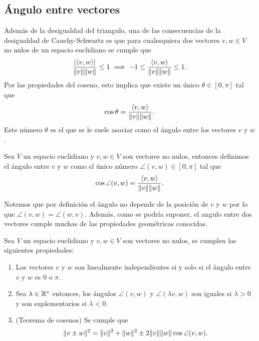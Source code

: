 \subsection{Ángulo entre vectores}

Además de la desigualdad del triangulo, una de las consecuencias de la desigualdad de Cauchy-Schwartz es que para cualesquiera dos vectores $v,w \in V$ no nulos de un espacio euclidiano se cumple que
\[
  \frac{\mathopen|\langle v,w\rangle\mathclose|}{\mathopen\|v\mathclose\|\mathopen\|w\mathclose\|} \leq 1 \implies  -1 \leq \frac{\langle v,w\rangle}{\mathopen\|v\mathclose\|\mathopen\|w\mathclose\|} \leq 1.
\]
Por las propiedades del coseno, esto implica que existe un único $\theta \in [0,\pi]$ tal que 
\[
  \cos\theta = \frac{\langle v,w\rangle}{\mathopen\|v\mathclose\|\mathopen\|w\mathclose\|}.
\]
Este número $\theta$ es el que se le suele asociar como el ángulo entre los vectores $v$ y $w$.

\begin{defi}
  Sea $V$ un espacio euclidiano y $v,w \in V$ son vectores no nulos, entonces definimos el ángulo entre $v$ y $w$ como el único número $\angle(v,w) \in [0,\pi]$ tal que
    \[ \cos\angle(v,w) = \frac{\langle v,w\rangle}{\mathopen\|v\mathclose\|\mathopen\|w\mathclose\|}. \]
\end{defi}

Notemos que por definición el ángulo no depende de la posición de $v$ y $w$ por lo que $\angle(v,w) = \angle(w,v)$. Además, como se podría suponer, el angulo entre dos vectores cumple muchas de las propiedades geométricas conocidas.

\begin{teor}
  Sea $V$ un espacio euclidiano y $v,w \in V$ son vectores no nulos, se cumplen las siguientes propiedades:
  \begin{enumerate}
    \item Los vectores $v$ y $w$ son linealmente independientes si y solo si el ángulo entre $v$ y $w$ es $0$ o $\pi$.
    \item Sea $\lambda \in \mathbb{R}^*$ entonces, los ángulos $\angle(v,w)$ y $\angle(\lambda v,w)$ son iguales si $\lambda > 0$ y son suplementarios si $\lambda < 0$.
    \item (Teorema de cosenos) Se cumple que
      \[ \mathopen\|v \pm w\mathclose\|^2 = \mathopen\|v\mathclose\|^2 + \mathopen\|w\mathclose\|^2 \pm 2\mathopen\|v\mathclose\|\mathopen\|w\mathclose\|\cos\angle(v,w). \]
  \end{enumerate}
\end{teor}

